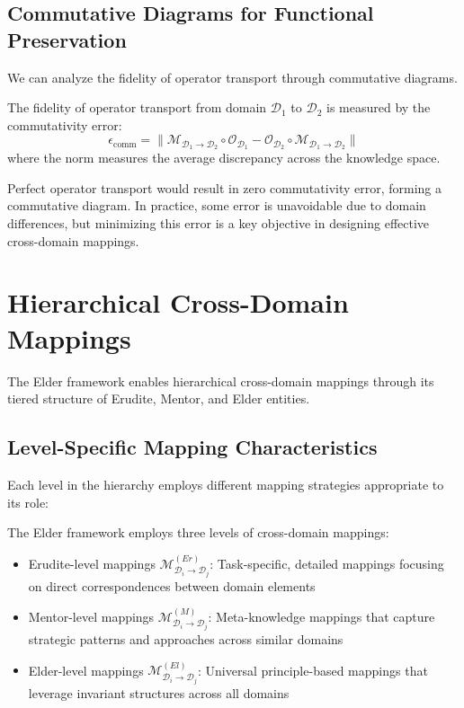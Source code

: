 \subsection{Commutative Diagrams for Functional Preservation}

We can analyze the fidelity of operator transport through commutative diagrams.

\begin{theorem}
The fidelity of operator transport from domain $\mathcal{D}_1$ to $\mathcal{D}_2$ is measured by the commutativity error:
\begin{equation}
\epsilon_{\text{comm}} = \|\mathcal{M}_{\mathcal{D}_1 \rightarrow \mathcal{D}_2} \circ \mathcal{O}_{\mathcal{D}_1} - \mathcal{O}_{\mathcal{D}_2} \circ \mathcal{M}_{\mathcal{D}_1 \rightarrow \mathcal{D}_2}\|
\end{equation}
where the norm measures the average discrepancy across the knowledge space.
\end{theorem}

Perfect operator transport would result in zero commutativity error, forming a commutative diagram. In practice, some error is unavoidable due to domain differences, but minimizing this error is a key objective in designing effective cross-domain mappings.

\section{Hierarchical Cross-Domain Mappings}

The Elder framework enables hierarchical cross-domain mappings through its tiered structure of Erudite, Mentor, and Elder entities.

\subsection{Level-Specific Mapping Characteristics}

Each level in the hierarchy employs different mapping strategies appropriate to its role:

\begin{definition}
The Elder framework employs three levels of cross-domain mappings:
\begin{itemize}
    \item Erudite-level mappings $\mathcal{M}^{(Er)}_{\mathcal{D}_i \rightarrow \mathcal{D}_j}$: Task-specific, detailed mappings focusing on direct correspondences between domain elements
    \item Mentor-level mappings $\mathcal{M}^{(M)}_{\mathcal{D}_i \rightarrow \mathcal{D}_j}$: Meta-knowledge mappings that capture strategic patterns and approaches across similar domains
    \item Elder-level mappings $\mathcal{M}^{(El)}_{\mathcal{D}_i \rightarrow \mathcal{D}_j}$: Universal principle-based mappings that leverage invariant structures across all domains
\end{itemize}
\end{definition}

